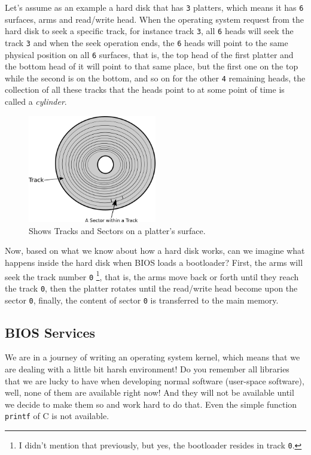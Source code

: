 Let's assume as an example a hard disk that has \lstinline!3! platters,
which means it has \lstinline!6! surfaces, arms and read/write head.
When the operating system request from the hard disk to seek a specific
track, for instance track \lstinline!3!, all \lstinline!6! heads will
seek the track \lstinline!3! and when the seek operation ends, the
\lstinline!6! heads will point to the same physical position on all
\lstinline!6! surfaces, that is, the top head of the first platter and
the bottom head of it will point to that same place, but the first one
on the top while the second is on the bottom, and so on for the other
\lstinline!4! remaining heads, the collection of all these tracks that
the heads point to at some point of time is called a \emph{cylinder}.

\begin{figure}
\centering
\includegraphics[width=0.50000\textwidth]{Figures/bootloader-ch/tracks-sectors.png}
\caption{Shows Tracks and Sectors on a platter's
surface.}\label{fig:tracks-sectors}
\end{figure}

Now, based on what we know about how a hard disk works, can we imagine
what happens inside the hard disk when BIOS loads a bootloader? First,
the arms will seek the track number \lstinline!0! \footnote{I didn't
  mention that previously, but yes, the bootloader resides in track
  \lstinline!0!.}, that is, the arms move back or forth until they reach
the track \lstinline!0!, then the platter rotates until the read/write
head become upon the sector \lstinline!0!, finally, the content of
sector \lstinline!0! is transferred to the main memory.

\subsection{BIOS Services}\label{bios-services}

We are in a journey of writing an operating system kernel, which means
that we are dealing with a little bit harsh environment! Do you remember
all libraries that we are lucky to have when developing normal software
(user-space software), well, none of them are available right now! And
they will not be available until we decide to make them so and work hard
to do that. Even the simple function \lstinline!printf! of C is not
available.


